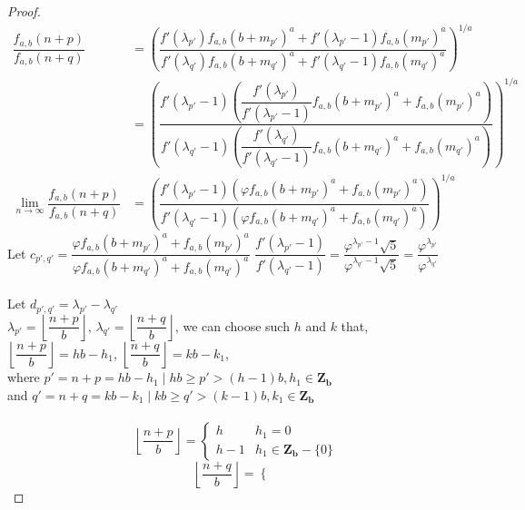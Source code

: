 \documentclass[preprint,12pt]{elsarticle}
\begin{document}
\begin{proof}
	\begin{align*}
		\dfrac{f_{a,b}(n+p)}{f_{a,b}(n+q)} &= \left(\dfrac{f'(\lambda_{p'})f_{a,b}(b+m_{p'})^a + f'(\lambda_{p'}-1)f_{a,b}(m_{p'})^a}{f'(\lambda_{q'})f_{a,b}(b+m_{q'})^a + f'(\lambda_{q'}-1)f_{a,b}(m_{q'})^a}\right)^{1/a}\\
		&= \left(\dfrac{f'(\lambda_{p'}-1)\left(\dfrac{f'(\lambda_{p'})}{f'(\lambda_{p'}-1)}f_{a,b}(b+m_{p'})^a + f_{a,b}(m_{p'})^a\right)}{f'(\lambda_{q'}-1)\left(\dfrac{f'(\lambda_{q'})}{f'(\lambda_{q'}-1)}f_{a,b}(b+m_{q'})^a + f_{a,b}(m_{q'})^a\right)}\right)^{1/a}\\
		\lim_{n \to \infty}\dfrac{f_{a,b}(n+p)}{f_{a,b}(n+q)} &=
		\left(\dfrac{f'(\lambda_{p'}-1)\left(\varphi f_{a,b}(b+m_{p'})^a + f_{a,b}(m_{p'})^a\right)}{f'(\lambda_{q'}-1)\left(\varphi f_{a,b}(b+m_{q'})^a + f_{a,b}(m_{q'})^a\right)}\right)^{1/a}
	\end{align*}
		Let $c_{p',q'} = \dfrac{\varphi f_{a,b}(b+m_{p'})^a + f_{a,b}(m_{p'})^a}{\varphi f_{a,b}(b+m_{q'})^a + f_{a,b}(m_{q'})^a}$
	\clearpage
	$\dfrac{f'(\lambda_{p'} - 1)}{f'(\lambda_{q'} - 1)} = \dfrac{\varphi^{\lambda_{p'} - 1}\sqrt{5}}{\varphi^{\lambda_{q'} - 1}\sqrt{5}} = \dfrac{\varphi^{\lambda_{p'}}}{\varphi^{\lambda_{q'}}}$\\\\
	Let $d_{p', q'} = \lambda_{p'} - \lambda_{q'}$\\
	$\lambda_{p'} = \left\lfloor\dfrac{n + p}{b}\right\rfloor$, $\lambda_{q'} = \left\lfloor\dfrac{n + q}{b}\right\rfloor$, we can choose such $h$ and $k$ that,\\
	$\left\lfloor\dfrac{n + p}{b}\right\rfloor = hb - h_1$, $\left\lfloor\dfrac{n + q}{b}\right\rfloor = kb - k_1$,\\where $p'= n + p = hb - h_1 \mid hb \geq p' > (h-1)b, h_1\in\mathbf{Z_b}$\\
	and $q' = n + q = kb - k_1 \mid kb \geq q' > (k-1)b, k_1\in\mathbf{Z_b}$\\\\
	\begin{equation*}
		\left\lfloor\dfrac{n + p}{b}\right\rfloor = \begin{cases}
		h & h_1 = 0\\
		h - 1 & h_1 \in \mathbf{Z_b} - \{0\}
		\end{cases}
	\end{equation*}
	\begin{equation*}
	\left\lfloor\dfrac{n + q}{b}\right\rfloor = \begin{cases}

\end{cases}
\end{equation*}
\end{proof}
\end{document}
